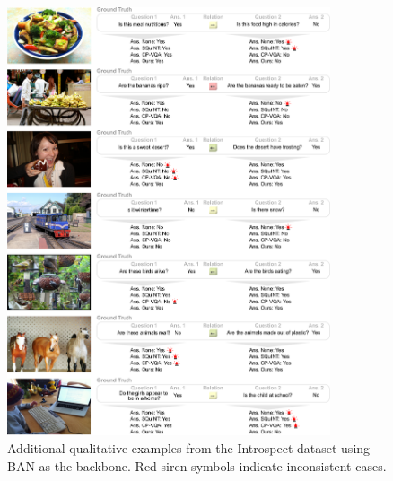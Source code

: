 \begin{figure}[!t]
\centering
\includegraphics[width=0.85\textwidth]{Figures/Part2_Consist/02_logic/examples_ban_supplementary3.pdf}
\caption{Additional qualitative examples from the Introspect dataset using BAN as the backbone. Red siren symbols indicate inconsistent cases.}
\label{fig:examples_introspect3}
\end{figure}

